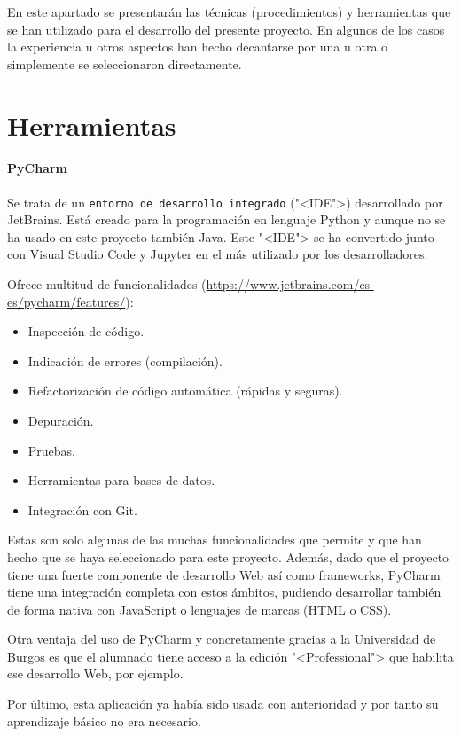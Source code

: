 
En este apartado se presentarán las técnicas (procedimientos) y herramientas que
se han utilizado para el desarrollo del presente proyecto. En algunos de los
casos la experiencia u otros aspectos han hecho decantarse por una u otra o
simplemente se seleccionaron directamente.


\section{Herramientas}

\paragraph{PyCharm}
Se trata de un \texttt{entorno de desarrollo integrado} ("<IDE">) desarrollado por
JetBrains. Está creado para la programación en lenguaje Python y aunque no se ha
usado en este proyecto también Java. Este "<IDE"> se ha convertido junto con Visual
Studio Code y Jupyter en el más utilizado por los desarrolladores.

Ofrece multitud de funcionalidades (\url{https://www.jetbrains.com/es-es/pycharm/features/}):
\begin{itemize}
	\item Inspección de código.
	\item Indicación de errores (compilación).
	\item Refactorización de código automática (rápidas y seguras).
	\item Depuración.
	\item Pruebas.
	\item Herramientas para bases de datos.
	\item Integración con Git.
\end{itemize}

Estas son solo algunas de las muchas funcionalidades que permite y que han hecho
que se haya seleccionado para este proyecto. Además, dado que el proyecto tiene
una fuerte componente de desarrollo Web así como frameworks, PyCharm tiene una
integración completa con estos ámbitos, pudiendo desarrollar también de forma
nativa con JavaScript o lenguajes de marcas (HTML o CSS).

Otra ventaja del uso de PyCharm y concretamente gracias a la Universidad de
Burgos es que el alumnado tiene acceso a la edición "<Professional"> que
habilita ese desarrollo Web, por ejemplo.

Por último, esta aplicación ya había sido usada con anterioridad y por tanto su
aprendizaje básico no era necesario.

